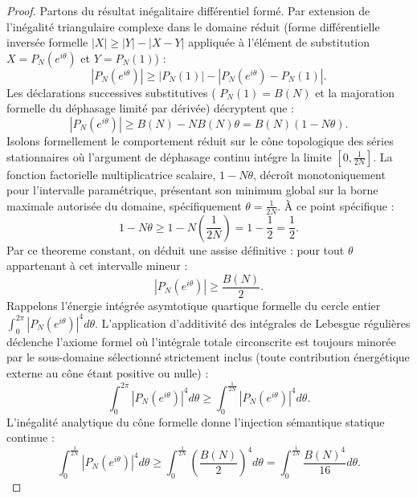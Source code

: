 \documentclass[12pt,a4paper]{article}
\begin{document}
\begin{proof}
Partons du r\'esultat in\'egalitaire diff\'erentiel form\'e. Par extension de l'in\'egalit\'e triangulaire complexe dans le domaine r\'eduit (forme diff\'erentielle invers\'ee formelle $|X| \ge |Y| - |X-Y|$ appliqu\'ee \`a l'\'el\'ement de substitution $X = P_N(e^{i\theta})$ et $Y = P_N(1)$) :
\begin{equation}
| P_N(e^{i\theta}) | \ge |P_N(1)| - | P_N(e^{i\theta}) - P_N(1) |.
\end{equation}
Les d\'eclarations successives substitutives ( $P_N(1) = B(N)$ et la majoration formelle du d\'ephasage limit\'e par d\'eriv\'ee) d\'ecryptent que :
\begin{equation}
| P_N(e^{i\theta}) | \ge B(N) - N B(N) \theta = B(N)(1 - N\theta).
\end{equation}
Isolons formellement le comportement r\'eduit sur le c\^one topologique des s\'eries stationnaires o\`u l'argument de d\'ephasage continu int\'egre la limite $[0, \frac{1}{2N}]$.
La fonction factorielle multiplicatrice scalaire, $1-N\theta$, d\'ecro\^it monotoniquement pour l'intervalle param\'etrique, pr\'esentant son minimum global sur la borne maximale autoris\'ee du domaine, sp\'ecifiquement $\theta = \frac{1}{2N}$. \`A ce point sp\'ecifique :
\begin{equation}
1 - N\theta \ge 1 - N\left(\frac{1}{2N}\right) = 1 - \frac{1}{2} = \frac{1}{2}.
\end{equation}
Par ce theoreme constant, on d\'eduit une assise d\'efinitive : pour tout $\theta$ appartenant \`a cet intervalle mineur :
\begin{equation}
| P_N(e^{i\theta}) | \ge \frac{B(N)}{2}.
\end{equation}
Rappelons l'\'energie int\'egr\'ee asymtotique quartique formelle du cercle entier $\int_0^{2\pi} |P_N(e^{i\theta})|^4 d\theta$. L'application d'additivit\'e des int\'egrales de Lebesgue r\'eguli\`eres d\'eclenche l'axiome formel o\`u l'int\'egrale totale circonscrite est toujours minor\'ee par le sous-domaine s\'electionn\'e strictement inclus (toute contribution \'energ\'etique externe au c\^one \'etant positive ou nulle) :
\begin{equation}
\int_0^{2\pi} |P_N(e^{i\theta})|^4 d\theta \ge \int_0^{\frac{1}{2N}} |P_N(e^{i\theta})|^4 d\theta.
\end{equation}
L'in\'egalit\'e analytique du c\^one formelle donne l'injection s\'emantique statique continue :
\begin{equation}
\int_0^{\frac{1}{2N}} |P_N(e^{i\theta})|^4 d\theta \ge \int_0^{\frac{1}{2N}} \left( \frac{B(N)}{2} \right)^4 d\theta = \int_0^{\frac{1}{2N}} \frac{B(N)^4}{16} d\theta.

\end{equation}
\end{proof}
\end{document}
